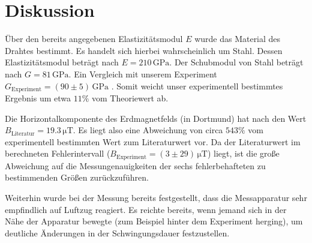 \section{Diskussion}
\label{sec:Diskussion}
Über den bereits angegebenen Elastizitätsmodul $E$ wurde das Material des Drahtes bestimmt.
Es handelt sich hierbei wahrscheinlich um Stahl. Dessen Elastizitätsmodul beträgt nach \cite{stahlharteJungs} $E=210 \,\si{\giga\pascal}$.
Der Schubmodul von Stahl beträgt nach \cite{stahlharteJungs} $G=81 \,\si{\giga\pascal}$. Ein Vergleich mit unserem Experiment $G_{\mathrm{Experiment}}=(90 \pm 5) \,\si{\giga\pascal}$ .
Somit weicht unser experimentell bestimmtes Ergebnis um etwa $11\%$ vom Theoriewert ab.

Die Horizontalkomponente des Erdmagnetfelds (in Dortmund) hat nach \cite{Potsdam} den Wert 
$B_{\mathrm{Literatur}}=19.3 \,\si{\micro\tesla}$.
Es liegt also eine Abweichung von circa $543\%$ vom experimentell bestimmten Wert
zum Literaturwert vor. Da der Literaturwert im berechneten Fehlerintervall ($B_{\mathrm{Experiment}}=(3\pm29)\,\si{\micro\tesla}$) liegt, ist die große Abweichung auf die Messungenauigkeiten 
der sechs fehlerbehafteten zu bestimmenden Größen zurückzuführen. 

Weiterhin wurde bei der Messung bereits festgestellt, dass die Messapparatur sehr empfindlich auf Luftzug reagiert. Es reichte bereits,
wenn jemand sich in der Nähe der Apparatur bewegte (zum Beispiel hinter dem Experiment herging), um deutliche Änderungen in der Schwingungsdauer festzustellen.
